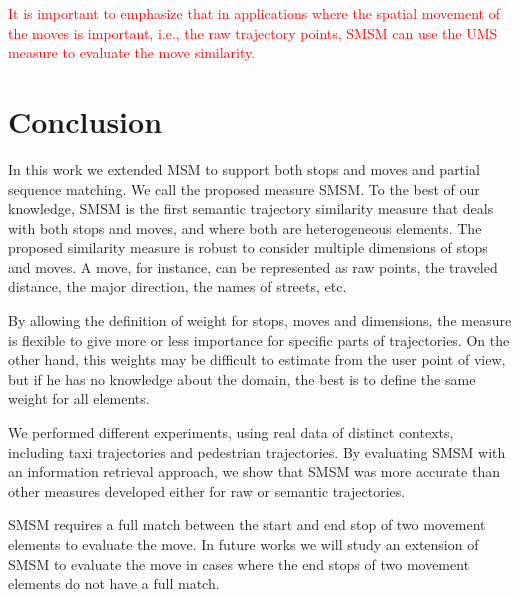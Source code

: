 \documentclass[12pt]{article}
\begin{document}
\textcolor{red}{It is important to emphasize that in applications where the spatial movement of the moves is important, i.e., the raw trajectory points, SMSM can use the UMS measure to evaluate the move similarity.}

\section{Conclusion} \label{sec:conclusions}
In this work we extended MSM to support both stops and moves and partial sequence matching. We call the proposed measure SMSM. To the best of our knowledge, SMSM is the first semantic trajectory similarity measure that deals with both stops and moves, and where both are heterogeneous elements. 
The proposed similarity measure is robust  to consider multiple dimensions of stops and moves. A move, for instance, can be represented as raw points, the traveled distance, the major direction, the names of streets, etc.

By allowing the definition of weight for stops, moves and dimensions, the measure is flexible to give more or less importance for specific parts of trajectories. On the other hand, this weights may be difficult to estimate from the user point of view, but if he has no knowledge about the domain, the best is to define the same weight for all elements.

We performed different experiments, using real data of distinct contexts, including taxi trajectories and pedestrian trajectories. By evaluating SMSM with an information retrieval approach, we show that SMSM was more accurate than other measures developed either for raw or semantic trajectories.

SMSM requires a full match between the start and end stop of two movement elements to evaluate the move. In future works we will study an extension of SMSM to evaluate the move in cases where the end stops of two movement elements do not have a full match.



\end{document}
